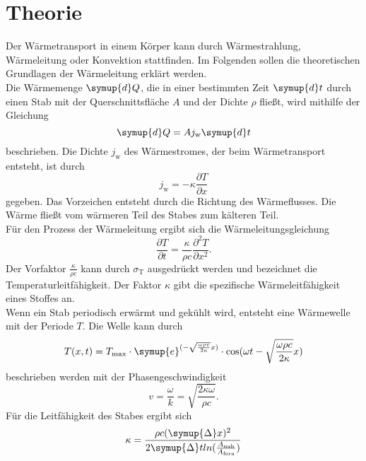 \section{Theorie} \label{sec:theorie}

    Der Wärmetransport in einem Körper kann durch Wärmestrahlung, Wärmeleitung oder Konvektion
    stattfinden.
    Im Folgenden sollen die theoretischen Grundlagen der Wärmeleitung erklärt werden. \\
    Die Wärmemenge $\symup{d}Q$, die in einer bestimmten Zeit $\symup{d}t$ durch einen Stab mit der
    Querschnittsfläche $A$ und der Dichte $\rho$ fließt, wird mithilfe der Gleichung
    \begin{equation}
        \symup{d}Q =  A j_\text{w} \symup{d}t
    \end{equation}
    beschrieben. 
    Die Dichte $j_\text{w}$ des Wärmestromes, der beim Wärmetransport entsteht, ist durch 
    \begin{equation}
        j_\text{w} = - \kappa \frac{\partial T}{\partial x}
    \end{equation}
    gegeben.
    Das Vorzeichen entsteht durch die Richtung des Wärmeflusses. Die Wärme fließt
    vom wärmeren Teil des Stabes zum kälteren Teil.\\
    Für den Prozess der Wärmeleitung ergibt sich die Wärmeleitungsgleichung
    \begin{equation}
        \frac{\partial T}{\partial t} = \frac{\kappa}{\rho c} \frac{\partial^2 T}{\partial x^2} .
    \end{equation}
    Der Vorfaktor $\frac{\kappa}{\rho c}$ kann durch $\sigma_\text{T}$ ausgedrückt werden
    und bezeichnet die Temperaturleitfähigkeit. 
    Der Faktor $\kappa$ gibt die spezifische Wärmeleitfähigkeit eines Stoffes an. \\
    Wenn ein Stab periodisch erwärmt und gekühlt wird, entsteht eine Wärmewelle mit der Periode $T$.
    Die Welle kann durch 
    \begin{equation}
        T(x,t) = T_\text{max} \cdot \symup{e}^{(- \sqrt{\frac{\omega \rho c}{2\kappa}}x)} \cdot \cos(\omega t - \sqrt{\frac{\omega \rho c}{2 \kappa}}x)
    \end{equation}
    beschrieben werden mit der Phasengeschwindigkeit
    \begin{equation}
        v = \frac{\omega}{k} = \sqrt{\frac{2 \kappa \omega}{\rho c}} .
    \end{equation}
    Für die Leitfähigkeit des Stabes ergibt sich
    \begin{equation}
        \kappa = \frac{\rho c (\symup{\Delta}x)^2}{2 \symup{\Delta}t ln(\frac{A_\text{nah}}{A_\text{fern}})} 
    \end{equation}

